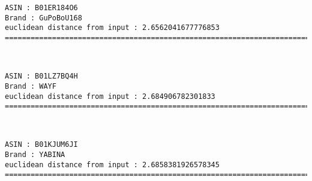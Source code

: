 \documentclass[11pt]{article}
\begin{document}
    \begin{Verbatim}[commandchars=\\\{\}]
ASIN : B01ER184O6
Brand : GuPoBoU168
euclidean distance from input : 2.6562041677776853
=============================================================================================================================

    \end{Verbatim}

    
    
    \begin{center}
    \end{center}
    { \hspace*{\fill} \\}
    
    \begin{Verbatim}[commandchars=\\\{\}]
ASIN : B01LZ7BQ4H
Brand : WAYF
euclidean distance from input : 2.684906782301833
=============================================================================================================================

    \end{Verbatim}

    
    
    \begin{center}
    \end{center}
    { \hspace*{\fill} \\}
    
    \begin{Verbatim}[commandchars=\\\{\}]
ASIN : B01KJUM6JI
Brand : YABINA
euclidean distance from input : 2.6858381926578345
=============================================================================================================================

    \end{Verbatim}

    
    
    \begin{center}
    \end{center}
    { \hspace*{\fill} \\}
    
\end{document}
